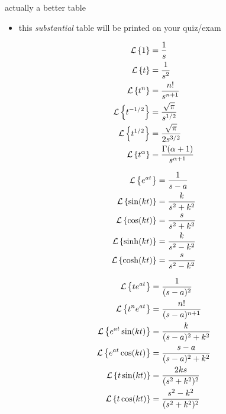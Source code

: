 \documentclass[dvipsnames,colorlinks]{beamer}
\begin{document}
\begin{frame}{actually a better table}

\small
\begin{itemize}
\item this \emph{substantial} table will be printed on your quiz/exam
\end{itemize}

\vspace{-3mm}
\tiny
\begin{minipage}[t]{0.3\textwidth}
\begin{align*}
\mathcal{L}\left\{1\right\} &= \frac{1}{s} \\
\mathcal{L}\left\{t\right\} &= \frac{1}{s^2} \\
\mathcal{L}\left\{t^n\right\} &= \frac{n!}{s^{n+1}} \\
\mathcal{L}\left\{t^{-1/2}\right\} &= \frac{\sqrt{\pi}}{s^{1/2}} \\
\mathcal{L}\left\{t^{1/2}\right\} &= \frac{\sqrt{\pi}}{2s^{3/2}} \\
\mathcal{L}\left\{t^\alpha\right\} &= \frac{\Gamma(\alpha+1)}{s^{\alpha+1}}
\end{align*}
\end{minipage}
\begin{minipage}[t]{0.3\textwidth}
\begin{align*}
\mathcal{L}\left\{e^{at}\right\} &= \frac{1}{s-a} \\
\mathcal{L}\left\{\sin(kt)\right\} &= \frac{k}{s^2+k^2} \\
\mathcal{L}\left\{\cos(kt)\right\} &= \frac{s}{s^2+k^2} \\
\mathcal{L}\left\{\sinh(kt)\right\} &= \frac{k}{s^2-k^2} \\
\mathcal{L}\left\{\cosh(kt)\right\} &= \frac{s}{s^2-k^2}
\end{align*}
\end{minipage}
\begin{minipage}[t]{0.3\textwidth}
\begin{align*}
\mathcal{L}\left\{te^{at}\right\} &= \frac{1}{(s-a)^2} \\
\mathcal{L}\left\{t^n e^{at}\right\} &= \frac{n!}{(s-a)^{n+1}} \\
\mathcal{L}\left\{e^{at}\sin(kt)\right\} &= \frac{k}{(s-a)^2+k^2} \\
\mathcal{L}\left\{e^{at}\cos(kt)\right\} &= \frac{s-a}{(s-a)^2+k^2} \\
\mathcal{L}\left\{t\sin(kt)\right\} &= \frac{2ks}{(s^2+k^2)^2} \\
\mathcal{L}\left\{t\cos(kt)\right\} &= \frac{s^2-k^2}{(s^2+k^2)^2}
\end{align*}
\end{minipage}


\end{frame}
\end{document}
